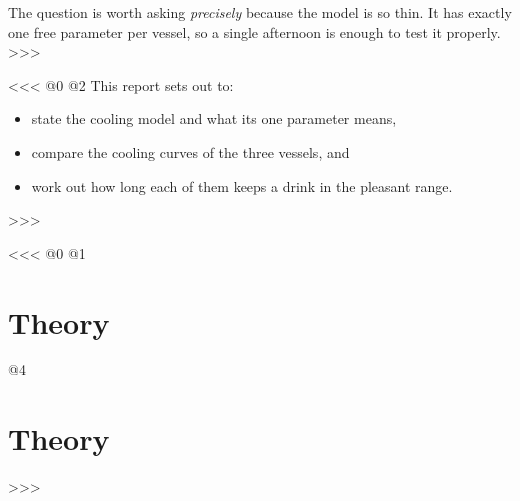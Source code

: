 The question is worth asking \emph{precisely} because the model is so thin.
It has exactly one free parameter per vessel,
so a single afternoon is enough to test it properly.
>>>

<<<
@0
@2
This report sets out to:
\begin{itemize}
    \item state the cooling model and what its one parameter means,
    \item compare the cooling curves of the three vessels, and
    \item work out how long each of them keeps a drink in the pleasant range.
\end{itemize}
>>>

<<<
@0
@1
\section{Theory}
@4
\section{Theory}\label{sec:theory}
>>>

